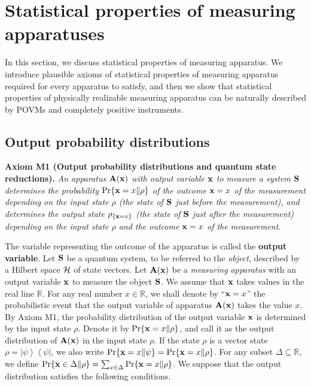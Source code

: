 \documentclass[graybox]{svmult}
\newcommand{\bA}{{\bf A}}
\newcommand{\bS}{{\bf S}}
\def\ps{\psi}
\newcommand{\rh}{\rho}
\newcommand{\De}{\Delta}
\newcommand{\bx}{{\bf x}}
\newcommand{\R}{\mathbb{R}}
\newcommand{\bra}[1]{\left\langle#1\right|}
\newcommand{\ket}[1]{\left|#1\right\rangle}
\begin{document}
\section{Statistical properties of measuring apparatuses}

In this section, we discuss statistical properties of measuring apparatus.
We introduce plausible axioms of statistical properties of measuring apparatus
required for every apparatus to satisfy, and then we show that  statistical properties 
of physically realizable measuring apparatus can be naturally described by POVMs
and completely positive instruments.

\subsection{Output probability distributions}

{\bf Axiom M1 (Output probability distributions and quantum state reductions).}
{\em An apparatus $\bA(\bx)$ with output variable $\bx$ to measure a system $\bS$ determines the probability 
$\Pr\{\bx=x\|\rh\}$ of  the outcome $\bx=x$ of the measurement depending 
on the input state $\rh$ (the state of\/ $\bS$ just before the measurement),
and determines the output state  $\rh_{\{\bx=x\}}$ (the state of\/ $\bS$ just after the measurement) 
depending on the input state $\rh$
and the outcome $\bx=x$ of the measurement.}
\bigskip



The variable representing the outcome of the apparatus is called the 
{\bf output variable}.
Let ${\bf S}$ be a quantum system, to be referred to the {\em object}, 
described by a Hilbert space ${\cal H}$ of state vectors.
Let $\bA(\bx)$ be a {\em measuring apparatus} with an output
variable $\bx$ to measure the {object} $\bS$.
We assume that $\bx$ takes values in the real line $\R$.
For any real number  $x\in\R$, we shall denote by ``$\bx=x$'' 
the probabilistic event
that the output variable of apparatus $\bA(\bx)$ takes the value $x$.
By Axiom M1, the probability distribution of the output variable 
$\bx$ is determined by the input state $\rh$.
Denote it by $\Pr\{\bx=x\|\rh\}$, and call it as 
the output distribution of $\bA(\bx)$  in the input state $\rh$.
 If the state $\rh$ is a vector state $\rh=\ket{\ps}\bra{\ps}$,
we also write $\Pr\{\bx=x\|\ps\}=\Pr\{\bx=x\|\rh\}$.
For any subset $\De\subseteq \R$, we define 
$\Pr\{\bx\in\De\|\rh\}=\sum_{x\in\De}\Pr\{\bx=x\|\rh\}$.
We suppose that the output distribution satisfies the following conditions. 
\end{document}
